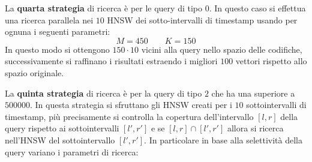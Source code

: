 La \textbf{quarta strategia} di ricerca è per le query di tipo $0$. In questo caso 
si effettua una ricerca parallela nei $10$ HNSW dei sotto-intervalli di timestamp 
usando per ognuna i seguenti parametri:
$$M=450 \qquad K=150$$
In questo modo si ottengono $150\cdot 10$ vicini alla query nello spazio delle 
codifiche, successivamente si raffinano i risultati estraendo i migliori $100$ 
vettori rispetto allo spazio originale.

La \textbf{quinta strategia} di ricerca è per la query di tipo $2$ che ha una 
superiore a $500000$. In questa strategia si sfruttano gli HNSW creati per i $10$
sottointervalli di timestamp, più precisamente si controlla la copertura dell'intervallo 
$[l,r]$ della query rispetto ai sottointervalli $[l',r']$ e se $[l,r]\cap [l',r']$ 
allora si ricerca nell'HNSW del sottointervallo $[l',r']$. 
In particolare in base alla selettività della query variano i parametri di ricerca:
